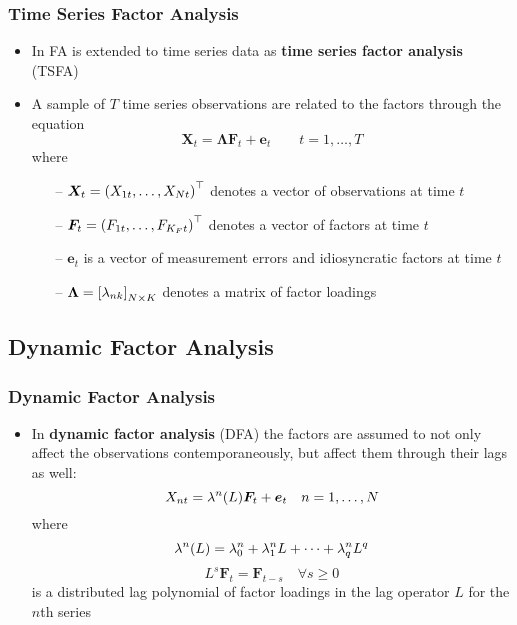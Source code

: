 \documentclass[10pt, compress, notheorems, aspectratio=169]{beamer}
\let\originalleft\left
\let\originalright\right
\renewcommand{\left}{\mathopen{}\mathclose \bgroup \originalleft}
\renewcommand{\right}{\aftergroup \egroup \originalright}
\begin{document}
\begin{frame}
	\frametitle{Time Series Factor Analysis}
	\begin{itemize}
		\item In \cite{gilbert2005time} FA is extended to time series data as \textbf{time series factor analysis} (TSFA)
		\item A sample of $T$ time series observations are related to the factors through the equation
			\begin{equation}
				{\bm X}_t = {\bm \Lambda} {\bm F}_t + {\bm e}_t \qquad t = 1, \ldots, T
			\end{equation}
			where
			\begin{itemize}
				\item[--] ${\bm X}_t = \left( X_{1t}, \ldots, X_{Nt} \right)^{\top}$ denotes a vector of observations at time $t$
				\item[--] ${\bm F}_t = \left( F_{1t}, \ldots, F_{K_F t} \right)^{\top}$ denotes a vector of factors at time $t$
				\item[--] ${\bm e}_t$ is a vector of measurement errors and idiosyncratic factors at time $t$
				\item[--] ${\bm \Lambda} = \left[ \lambda_{nk} \right]_{N \times K}$ denotes a matrix of factor loadings
			\end{itemize}
	\end{itemize}
\end{frame}

\subsection{Dynamic Factor Analysis}
\begin{frame}
	\frametitle{Dynamic Factor Analysis}
	\begin{itemize}
		\item In \textbf{dynamic factor analysis} (DFA) the factors are assumed to not only affect the observations contemporaneously, but affect them through their lags as well:
			\begin{equation}
				X_{nt} = {\lambda}^n \left( L \right) {\bm F}_t + {\bm e}_t \quad n = 1, \ldots, N
			\end{equation}
			where 
			\begin{equation*}
				{\lambda}^n \left( L \right) = {\lambda}^n_0 + {\lambda}^n_1 L + \cdots + {\lambda}^n_q L^q
			\end{equation*}
			\begin{equation*}
				L^s {\bm F}_t = {\bm F}_{t-s} \quad \forall s \geq 0
			\end{equation*}
			is a distributed lag polynomial of factor loadings in the lag operator $L$ for the $n$th series
	\end{itemize}
\end{frame}
\end{document}
